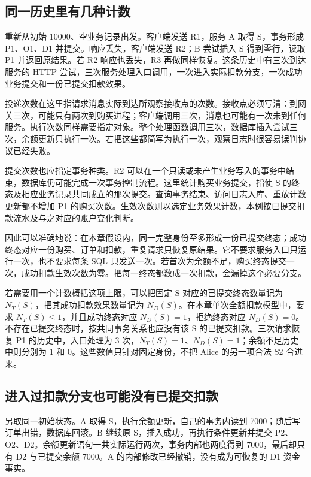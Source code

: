 \subsection*{同一历史里有几种计数}

重新从初始 10000、空业务记录出发。客户端发送 R1，服务 A 取得 S，事务形成 P1、O1、D1 并提交。响应丢失，客户端发送 R2；B 尝试插入 S 得到零行，读取 P1 并返回原结果。若 R2 响应也丢失，R3 再做同样恢复。这条历史中有三次到达服务的 HTTP 尝试，三次服务处理入口调用，一次进入实际扣款分支，一次成功业务提交和一份已提交扣款效果。

投递次数在这里指请求消息实际到达所观察接收点的次数。接收点必须写清：到网关三次，可能只有两次到购买进程；客户端调用三次，消息也可能有一次未到任何服务。执行次数同样需要指定对象。整个处理函数调用三次，数据库插入尝试三次，余额更新只执行一次。若把这些都简写为执行一次，观察日志时很容易误判协议已经失败。

提交次数也应指定事务种类。R2 可以在一个只读或未产生业务写入的事务中结束，数据库仍可能完成一次事务控制流程。这里统计购买业务提交，指使 S 的终态及相应业务记录共同成立的那次提交。查询事务结束、访问日志入库、重放计数更新都不增加 P1 的购买次数。生效次数则以选定业务效果计数，本例按已提交扣款流水及与之对应的账户变化判断。



因此可以准确地说：在本章假设内，同一完整身份至多形成一份已提交终态；成功终态对应一份购买、订单和扣款，重复请求只恢复原结果。它不要求服务入口只运行一次，也不要求每条 SQL 只发送一次。若首次为余额不足，购买终态提交一次，成功扣款生效次数为零。把每一终态都数成一次扣款，会漏掉这个必要分支。

若需要用一个计数概括这项上限，可以把固定 S 对应的已提交终态数量记为 \(N_T(S)\)，把其成功扣款效果数量记为 \(N_D(S)\)。在本章单次全额扣款模型中，要求 \(N_T(S)\leq 1\)，并且成功终态对应 \(N_D(S)=1\)，拒绝终态对应 \(N_D(S)=0\)。不存在已提交终态时，按共同事务关系也应没有该 S 的已提交扣款。三次请求恢复 P1 的历史中，入口处理为 3 次，\(N_T(S)=1\)、\(N_D(S)=1\)；余额不足历史中则分别为 1 和 0。这些数值只针对固定身份，不把 Alice 的另一项合法 S2 合进来。

\subsection*{进入过扣款分支也可能没有已提交扣款}

另取同一初始状态。A 取得 S，执行余额更新，自己的事务内读到 7000；随后写订单出错，数据库回滚。B 继续原 S，插入成功，再执行条件更新并提交 P2、O2、D2。余额更新语句一共实际运行两次，事务内部也两度得到 7000，最后却只有 D2 与已提交余额 7000。A 的内部修改已经撤销，没有成为可恢复的 D1 资金事实。

